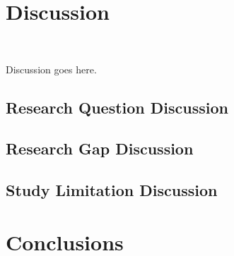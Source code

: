 \documentclass[parskip=full]{scrartcl}
\begin{document}
\section{Discussion}~\label{sec:discussion}

Discussion goes here.

\subsection{Research Question Discussion}

\subsection{Research Gap Discussion}

\subsection{Study Limitation Discussion}

\section{Conclusions}



\end{document}
